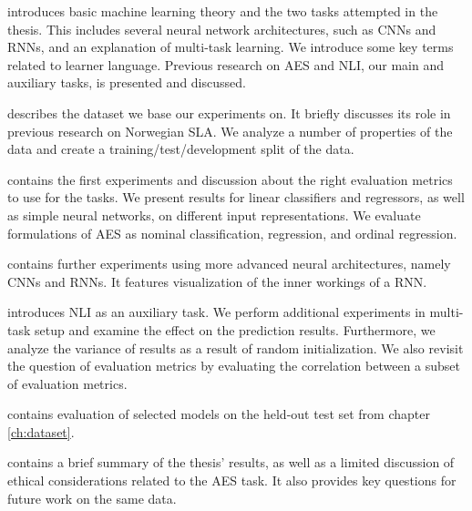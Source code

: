 \begin{description}[style=unboxed,leftmargin=0cm]
\item [Chapter \ref{ch:background}]
  introduces basic machine learning theory and the two tasks attempted in the
  thesis. This includes several neural network architectures, such as
  \acp{CNN} and \acp{RNN}, and an explanation of multi-task learning. We
  introduce some key terms related to learner language. Previous research on
  \ac{AES} and \ac{NLI}, our main and auxiliary tasks, is presented and
  discussed.

\item [Chapter \ref{ch:dataset}]
  describes the dataset we base our experiments on. It briefly discusses its
  role in previous research on Norwegian \ac{SLA}. We analyze a number of
  properties of the data and create a training/test/development split of the
  data.

\item [Chapter \ref{ch:experiments}]
  contains the first experiments and discussion about the right evaluation
  metrics to use for the tasks. We present results for linear classifiers and
  regressors, as well as simple neural networks, on different input
  representations. We evaluate formulations of \ac{AES} as nominal
  classification, regression, and ordinal regression.

\item [Chapter \ref{ch:sequencemodels}]
  contains further experiments using more advanced neural architectures,
  namely \acp{CNN} and \acp{RNN}. It features visualization of the inner
  workings of a RNN.

\item [Chapter \ref{ch:multitask}]
  introduces \ac{NLI} as an auxiliary task. We perform additional experiments
  in multi-task setup and examine the effect on the prediction results.
  Furthermore, we analyze the variance of results as a result of random
  initialization. We also revisit the question of evaluation metrics by
  evaluating the correlation between a subset of evaluation metrics.

\item [Chapter \ref{ch:heldout}]
  contains evaluation of selected models on the held-out test set from
  chapter \ref{ch:dataset}.

\item [Chapter \ref{ch:conclusion}]
  contains a brief summary of the thesis' results, as well as a limited
  discussion of ethical considerations related to the \ac{AES} task. It
  also provides key questions for future work on the same data.
\end{description}

\acresetall
